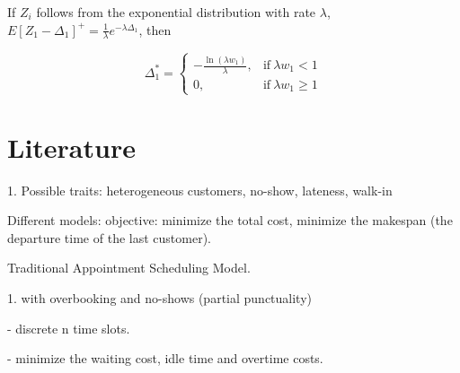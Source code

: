 \documentclass{article}
\newcommand{\Z}{\mathbf{Z}}
\newcommand{\D}{\bm{\Delta}}
\begin{document}
If $Z_{i}$ follows from the exponential distribution with rate $\lambda$, $E\left[Z_{1}- \Delta_{1} \right]^{+} = \frac{1}{\lambda} e^{-\lambda \Delta_{1}}$, then

\begin{equation*}
	\Delta_{1}^{*} = \begin{cases}
	-\frac{\ln (\lambda w_{1})}{\lambda}, & \text{if}~ \lambda w_{1} < 1 \\
	0, & \text{if}~ \lambda w_{1} \geq 1	
	\end{cases}
\end{equation*}






\newpage

\section{Literature}

1. Possible traits: heterogeneous customers, no-show, lateness, walk-in

Different models: objective: minimize the total cost, minimize the makespan (the departure time of the last customer).


Traditional Appointment Scheduling Model.

1. with overbooking and no-shows (partial punctuality)

- discrete n time slots.

- minimize the waiting cost, idle time and overtime costs.
\end{document}

